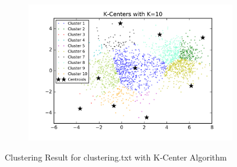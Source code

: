 \begin{description}
\begin{description}
\begin{figure}[!h]
\begin{subfigure}[b]{0.475\textwidth}
        \end{subfigure}
        \hfill
        \begin{subfigure}[b]{0.475\textwidth}   
            \centering 
            \includegraphics[width=\textwidth]{./figures/clustering_kCenter_10.png}
        \end{subfigure}
        
        \caption{Clustering Result for clustering.txt with K-Center Algorithm}
        \label{fig:kcenter_clustering}
\end{figure}


\end{description}
\end{description}
